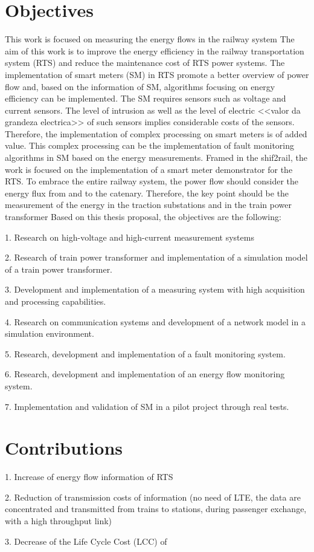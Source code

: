 

\lipsum[4-4]


\section{Objectives}

This work is focused on measuring the energy flows in the railway system
The aim of this work is to improve the energy efficiency in the railway transportation system (RTS) and reduce the maintenance cost of RTS power systems.
The implementation of smart meters (SM) in RTS promote a better overview of power flow and, based on the information of SM, algorithms focusing on energy efficiency can be implemented.
The SM requires sensors such as voltage and current sensors. The level of intrusion as well as the level of electric <<valor da grandeza electrica>> of such sensors implies considerable costs of the sensors.
Therefore, the implementation of complex processing on smart meters is of added value. This complex processing can be the implementation of fault monitoring algorithms in SM based on the energy measurements.
Framed in the shif2rail, the work is focused on the implementation of a smart meter demonstrator for the RTS. To embrace the entire railway system, the power flow should consider the energy flux from and to the catenary. Therefore, the key point should be the measurement of the energy in the traction substations and in the train power transformer 
Based on this thesis proposal, the objectives are the following:

1.	Research on high-voltage and high-current measurement systems

2.	Research of train power transformer and implementation of a simulation model of a train power transformer.

3.	Development and implementation of a measuring system with high acquisition and processing capabilities.

4.	Research on communication systems and development of a network model in a simulation environment.

5.	Research, development and implementation of a fault monitoring system.

6.	Research, development and implementation of an energy flow monitoring system.

7.	Implementation and validation of SM in a pilot project through real tests.


\section{Contributions}

1.	Increase of energy flow information of RTS

2.	Reduction of transmission costs of information (no need of LTE, the data are concentrated and transmitted from trains to stations, during passenger exchange, with a high throughput link)

3.	Decrease of the Life Cycle Cost (LCC) of 




